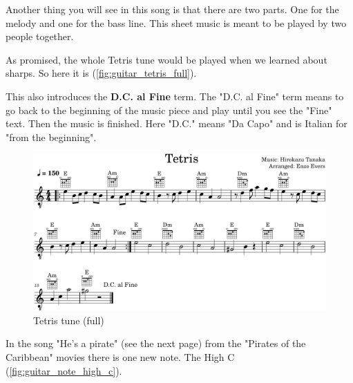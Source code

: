 Another thing you will see in this song is that there are two parts. One for the melody and one for the bass line. This sheet music is meant to be played by two people together.



As promised, the whole Tetris tune would be played when we learned about sharps. So here it is (\autoref{fig:guitar_tetris_full}).

This also introduces the \textbf{D.C. al Fine} term. The "D.C. al Fine" term means to go back to the beginning of the music piece and play until you see the "Fine" text. Then the music is finished. Here "D.C." means "Da Capo" and is Italian for "from the beginning".

\begin{figure}[h]
	\centering
	\includegraphics[width=\textwidth]{../../MuseScore/Guitar/GuitarTetrisFull.png}
	\caption{Tetris tune (full)}
	\label{fig:guitar_tetris_full}
\end{figure}

In the song "He's a pirate" (see the next page) from the "Pirates of the Caribbean" movies there is one new note. The High C (\autoref{fig:guitar_note_high_c}).

